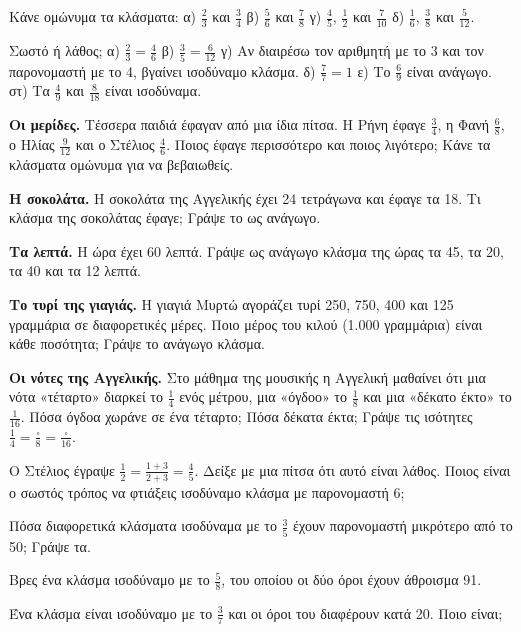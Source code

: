 \ex Κάνε ομώνυμα τα κλάσματα: α) $\frac{2}{3}$ και $\frac{3}{4}$ \quad β) $\frac{5}{6}$ και $\frac{7}{8}$ \quad γ) $\frac{4}{5}$, $\frac{1}{2}$ και $\frac{7}{10}$ \quad δ) $\frac{1}{6}$, $\frac{3}{8}$ και $\frac{5}{12}$.

\ex Σωστό ή λάθος; α) $\frac{2}{3}=\frac{4}{6}$ \quad β) $\frac{3}{5}=\frac{6}{12}$ \quad γ) Αν διαιρέσω τον αριθμητή με το 3 και τον παρονομαστή με το 4, βγαίνει ισοδύναμο κλάσμα. \quad δ) $\frac{7}{7}=1$ \quad ε) Το $\frac{6}{9}$ είναι ανάγωγο. \quad στ) Τα $\frac{4}{9}$ και $\frac{8}{18}$ είναι ισοδύναμα.


\ex \textbf{Οι μερίδες.} Τέσσερα παιδιά έφαγαν από μια ίδια πίτσα. Η Ρήνη έφαγε $\frac{3}{4}$, η Φανή $\frac{6}{8}$, ο Ηλίας $\frac{9}{12}$ και ο Στέλιος $\frac{4}{6}$. Ποιος έφαγε περισσότερο και ποιος λιγότερο; Κάνε τα κλάσματα ομώνυμα για να βεβαιωθείς.

\ex \textbf{Η σοκολάτα.} Η σοκολάτα της Αγγελικής έχει 24 τετράγωνα και έφαγε τα 18. Τι κλάσμα της σοκολάτας έφαγε; Γράψε το ως ανάγωγο.

\ex \textbf{Τα λεπτά.} Η ώρα έχει 60 λεπτά. Γράψε ως ανάγωγο κλάσμα της ώρας τα 45, τα 20, τα 40 και τα 12 λεπτά.

\ex \textbf{Το τυρί της γιαγιάς.} Η γιαγιά Μυρτώ αγοράζει τυρί 250, 750, 400 και 125 γραμμάρια σε διαφορετικές μέρες. Ποιο μέρος του κιλού (1.000 γραμμάρια) είναι κάθε ποσότητα; Γράψε το ανάγωγο κλάσμα.

\ex \textbf{Οι νότες της Αγγελικής.} Στο μάθημα της μουσικής η Αγγελική μαθαίνει ότι μια νότα «τέταρτο» διαρκεί το $\frac{1}{4}$ ενός μέτρου, μια «όγδοο» το $\frac{1}{8}$ και μια «δέκατο έκτο» το $\frac{1}{16}$. Πόσα όγδοα χωράνε σε ένα τέταρτο; Πόσα δέκατα έκτα; Γράψε τις ισότητες $\frac{1}{4}=\frac{\square}{8}=\frac{\square}{16}$.


\ex Ο Στέλιος έγραψε $\frac{1}{2}=\frac{1+3}{2+3}=\frac{4}{5}$. Δείξε με μια πίτσα ότι αυτό είναι λάθος. Ποιος είναι ο σωστός τρόπος να φτιάξεις ισοδύναμο κλάσμα με παρονομαστή 6;

\ex Πόσα διαφορετικά κλάσματα ισοδύναμα με το $\frac{3}{5}$ έχουν παρονομαστή μικρότερο από το 50; Γράψε τα.

\ex Βρες ένα κλάσμα ισοδύναμο με το $\frac{5}{8}$, του οποίου οι δύο όροι έχουν άθροισμα 91.

\ex Ένα κλάσμα είναι ισοδύναμο με το $\frac{3}{7}$ και οι όροι του διαφέρουν κατά 20. Ποιο είναι;


